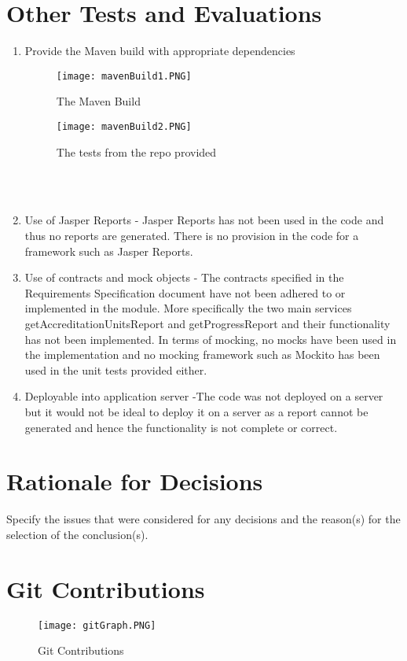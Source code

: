 \section{Other Tests and Evaluations}
 
\begin{enumerate}    
\item Provide the Maven build with appropriate dependencies
\begin{figure}[h!]
  \caption{The Maven Build}
	\texttt{[image: mavenBuild1.PNG]}
\end{figure} 
\begin{figure}[h!]
  \caption{The tests from the repo provided}
	\texttt{[image: mavenBuild2.PNG]}
\end{figure} \\ \\
\item Use of Jasper Reports - Jasper Reports has not been used in the code and thus no reports are generated. There is no provision in the code for a framework such as Jasper Reports. 
\item Use of contracts and mock objects - The contracts specified in the Requirements Specification document have not been adhered to or implemented in the module. More specifically the two main services getAccreditationUnitsReport and getProgressReport and their functionality has not been implemented. In terms of mocking, no mocks have been used in the implementation and no mocking framework such as Mockito has been used in the unit tests provided either.
\item Deployable into application server -The code was not deployed on a server but it would not be ideal to deploy it on a server as a report cannot be generated and hence the functionality is not complete or correct.  
\end{enumerate}

\section{Rationale for Decisions}
Specify the issues that were considered for any decisions and the reason(s) for the selection of the
conclusion(s).

\section{Git Contributions}
\begin{figure}[h!]
  \caption{Git Contributions}
	\texttt{[image: gitGraph.PNG]}
\end{figure} 


